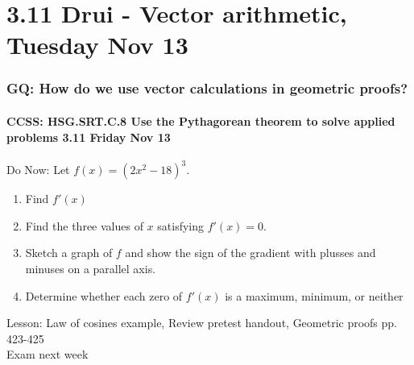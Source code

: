 \documentclass{beamer}
\begin{document}
\section{3.11 Drui - Vector arithmetic, Tuesday Nov 13}
  \frame
  {
    \frametitle{GQ: How do we use vector calculations in geometric proofs?}
    \framesubtitle{CCSS: HSG.SRT.C.8 Use the Pythagorean theorem to solve applied problems \qquad \alert{3.11 Friday Nov 13}}

    \begin{block}{Do Now: Let $f(x)= (2x^2-18)^3$.}
    \begin{enumerate}
        \item Find $f'(x)$
        \item Find the three values of $x$ satisfying $f'(x)=0$.
        \item Sketch a graph of $f$ and show the sign of the gradient with plusses and minuses on a parallel axis.
        \item Determine whether each zero of $f'(x)$ is a maximum, minimum, or neither
    \end{enumerate}
    \end{block}

    Lesson: Law of cosines example, Review pretest handout, Geometric proofs pp. 423-425\\ \bigskip
    \alert{Exam next week}
  }
\end{document}
